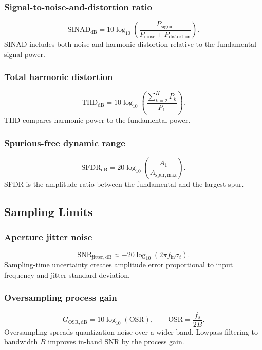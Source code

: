 \subsubsection{Signal-to-noise-and-distortion ratio}
\[
\mathrm{SINAD}_{\mathrm{dB}}=10\log_{10}\left(\frac{P_{\mathrm{signal}}}{P_{\mathrm{noise}}+P_{\mathrm{distortion}}}\right).
\]
SINAD includes both noise and harmonic distortion relative to the fundamental signal power.

\subsubsection{Total harmonic distortion}
\[
\mathrm{THD}_{\mathrm{dB}}=10\log_{10}\left(\frac{\sum_{k=2}^{K}P_k}{P_1}\right).
\]
THD compares harmonic power to the fundamental power.

\subsubsection{Spurious-free dynamic range}
\[
\mathrm{SFDR}_{\mathrm{dB}}=20\log_{10}\left(\frac{A_1}{A_{\mathrm{spur,max}}}\right).
\]
SFDR is the amplitude ratio between the fundamental and the largest spur.

\subsection{Sampling Limits}

\subsubsection{Aperture jitter noise}
\[
\mathrm{SNR}_{\mathrm{jitter,dB}}\approx -20\log_{10}(2\pi f_{\mathrm{in}}\sigma_t).
\]
Sampling-time uncertainty creates amplitude error proportional to input frequency and jitter standard deviation.

\subsubsection{Oversampling process gain}
\[
G_{\mathrm{OSR,dB}}=10\log_{10}(\mathrm{OSR}),\qquad
\mathrm{OSR}=\frac{f_s}{2B}.
\]
Oversampling spreads quantization noise over a wider band. Lowpass filtering to bandwidth \(B\) improves in-band SNR by the process gain.

